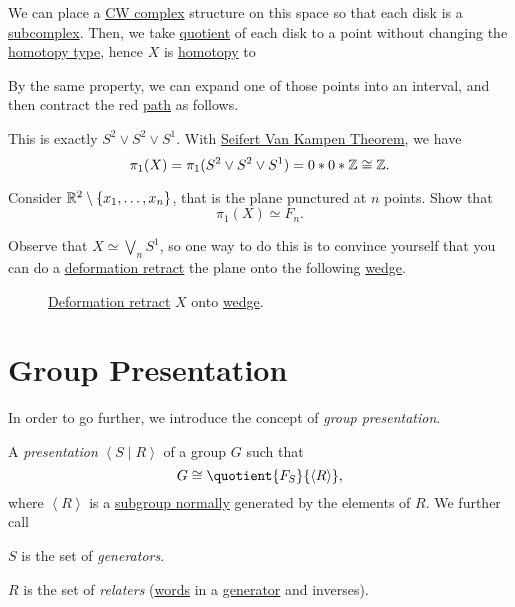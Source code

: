 \begin{explanation}
	We can place a \hyperref[def:CW-Complex]{CW complex} structure on this
	space so that each disk is a \hyperref[def:CW-subcomplex]{subcomplex}. Then, we take \hyperref[CW-complex-quotient]{quotient} of each disk
	to a point without changing the \hyperref[def:homotopy-type]{homotopy type}, hence \(X\) is \hyperref[def:homotopy]{homotopy} to
	\begin{figure}[H]
		\centering
		\label{fig:lec11:eg-3:2}
	\end{figure}
	By the same property, we can expand one of those points into an interval, and then contract the red \hyperref[def:path]{path} as follows.
	\begin{figure}[H]
		\centering
		\label{fig:lec11:eg-3:3}
	\end{figure}
	This is exactly \(S^{2} \vee S^{2} \vee S^1\). With \hyperref[thm:Seifert-Van-Kampen-Theorem]{Seifert Van Kampen Theorem}, we have
	\[
		\pi _1(X) = \pi _1(S^{2} \vee S^{2} \vee S^1) = 0\ast 0\ast \mathbb{\MakeUppercase{z}} \cong \mathbb{\MakeUppercase{z}}.
	\]
\end{explanation}
\begin{exercise}
	Consider \(\mathbb{\MakeUppercase{r}} ^2 \setminus \{x_1, \ldots , x_n \}\), that is the plane punctured at \(n\) points. Show that
	\[
		\pi _1(X)\simeq F_n.
	\]
\end{exercise}
\begin{answer}
	Observe that \(X \simeq \bigvee_n S^1\), so one way to do this is to convince yourself that you can do a
	\hyperref[def:deformation-retraction]{deformation retract} the plane onto the following \hyperref[CW-complex-wedge-sum]{wedge}.
	\begin{figure}[H]
		\centering
		\caption{\hyperref[def:deformation-retraction]{Deformation retract} \(X\) onto \hyperref[CW-complex-wedge-sum]{wedge}.}
		\label{fig:lec11:ex}
	\end{figure}
\end{answer}

\section{Group Presentation}
In order to go further, we introduce the concept of \emph{group presentation}.
\begin{definition}\label{def:group-presentation}
	A \emph{presentation} \(\left< S \mid R \right> \) of a group \(G\) such that
	\[
		G\cong \quotient{F_S}{\left< R \right>},
	\]
	where \(\left< R \right> \) is a \hyperref[def:normal-subgroup]{subgroup normally} generated by the elements of \(R\). We further call
	\begin{definition}[Generator]\label{def:generator}
		\(S\) is the set of \emph{generators}.
	\end{definition}
	\begin{definition}[Relater]\label{def:relater}
		\(R\) is the set of \emph{relaters} (\hyperref[def:word]{words} in a \hyperref[def:generator]{generator} and inverses).
	\end{definition}
\end{definition}

